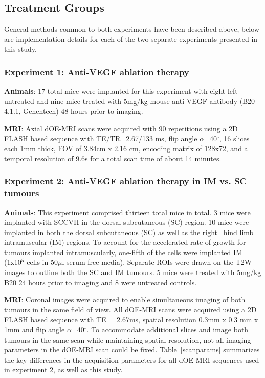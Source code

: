 \subsection{Treatment Groups}
General methods common to both experiments have been described above, below are implementation details for each of the two separate experiments presented in this study.

\subsubsection{Experiment 1: Anti-VEGF ablation therapy}
\noindent\textbf{Animals}: 17 total mice were implanted for this experiment with eight left untreated and nine mice treated with 5mg/kg mouse anti-VEGF antibody (B20-4.1.1, Genentech) 48 hours prior to imaging.

\noindent\textbf{MRI}: Axial dOE-MRI scans were acquired with 90 repetitions using a 2D FLASH based sequence with TE/TR=2.67/133 ms, flip angle $\alpha$=40$^\circ$, 16 slices each 1mm thick, FOV of 3.84cm x 2.16 cm, encoding matrix of 128x72, and a temporal resolution of 9.6s for a total scan time of about 14 minutes.

\subsubsection{Experiment 2: Anti-VEGF ablation therapy in IM vs. SC tumours}
\noindent\textbf{Animals}: This experiment comprised thirteen total mice in total. 
3 mice were implanted with SCCVII in the dorsal subcutaneous (SC) region.
10 mice were implanted in both the dorsal subcutaneous (SC) as well as the right~ hind limb intramuscular (IM) regions.
To account for the accelerated rate of growth for tumours implanted intramuscularly, one-fifth of the cells were implanted IM (1x10$^5$ cells in 50$\mu$l serum-free media).
Separate ROIs were drawn on the T2W images to outline both the SC and IM tumours.
5 mice were treated with 5mg/kg B20 24 hours prior to imaging and 8 were untreated controls. 

\noindent\textbf{MRI}: Coronal images were acquired to enable simultaneous imaging of both tumours in the same field of view.
All dOE-MRI scans were acquired using a 2D FLASH based sequence with TE = 2.67ms, spatial resolution 0.3mm x 0.3 mm x 1mm and flip angle $\alpha$=40$^\circ$.
To accommodate additional slices and image both tumours in the same scan while maintaining spatial resolution, not all imaging parameters in the dOE-MRI scan could be fixed. 
Table~\ref{scanparams} summarizes the key differences in the acquisition parameters for all dOE-MRI sequences used in experiment 2, as well as this study.


